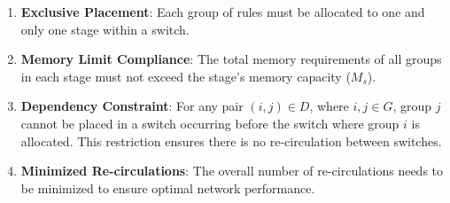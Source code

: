 \begin{enumerate}
    \item \textbf{Exclusive Placement}: Each group of rules must be allocated to one and only one stage within a switch.
    
    \item \textbf{Memory Limit Compliance}: The total memory requirements of all groups in each stage must not exceed the stage's memory capacity (\(M_s\)).
    
    \item \textbf{Dependency Constraint}: For any pair \((i, j) \in D\), where \(i, j \in G\), group \(j\) cannot be placed in a switch occurring before the switch where group \(i\) is allocated. This restriction ensures there is no re-circulation between switches.
    
    \item \textbf{Minimized Re-circulations}: The overall number of re-circulations needs to be minimized to ensure optimal network performance.
\end{enumerate}